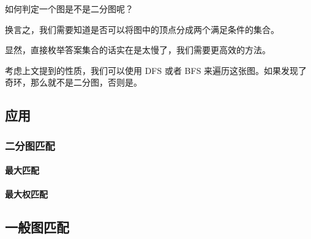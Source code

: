 如何判定一个图是不是二分图呢？

换言之，我们需要知道是否可以将图中的顶点分成两个满足条件的集合。

显然，直接枚举答案集合的话实在是太慢了，我们需要更高效的方法。

考虑上文提到的性质，我们可以使用  DFS  或者  BFS  来遍历这张图。如果发现了奇环，那么就不是二分图，否则是。

\subsection{应用}

\subsubsection{二分图匹配}

\paragraph{最大匹配}

\paragraph{最大权匹配}

\subsection{一般图匹配}
